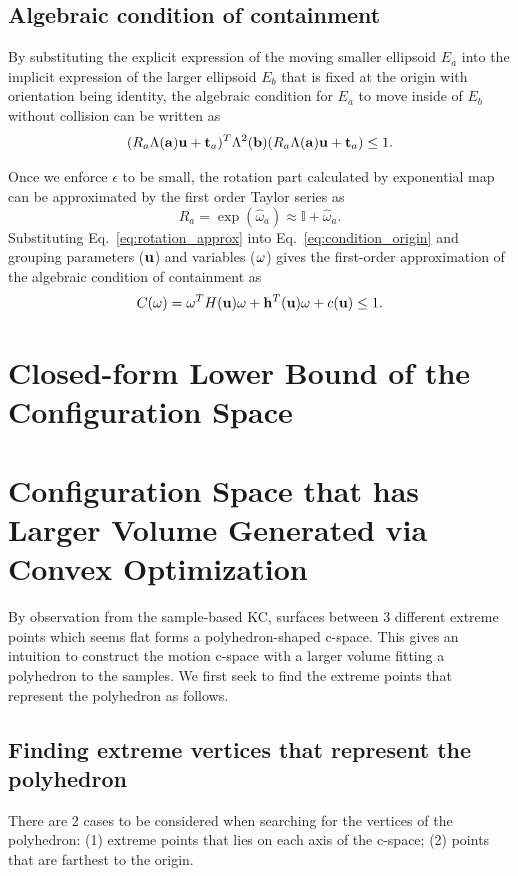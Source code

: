 \documentclass{article}
\begin{document}
\subsection{Algebraic condition of containment}
By substituting the explicit expression of the moving smaller ellipsoid $E_a$ into the implicit expression of the larger ellipsoid $E_b$ that is fixed at the origin with orientation being identity, the algebraic condition for $E_a$ to move inside of $E_b$ without collision can be written as
\begin{equation}
\label{eq:condition_origin}
(R_a \Lambda({\bf a}) {\bf u} + {\bf t}_a)^T \Lambda^2({\bf b}) (R_a \Lambda({\bf a}) {\bf u} + {\bf t}_a) \leq 1.
\end{equation}

Once we enforce $\epsilon$ to be small, the rotation part calculated by exponential map can be approximated by the first order Taylor series as
\begin{equation}
\label{eq:rotation_approx}
R_a = \exp(\hat{\omega}_a) \approx \mathbb{I} + \hat{\omega}_a.
\end{equation}
Substituting Eq.~\ref{eq:rotation_approx} into Eq.~\ref{eq:condition_origin} and grouping parameters (${\bf u}$) and variables (${\bf \omega}$) gives the first-order approximation of the algebraic condition of containment as
\begin{equation}
C({\bf \omega}) = {\bf \omega}^T H({\bf u}) {\bf \omega} + {\bf h}^T({\bf u}) {\bf \omega} + c({\bf u}) \leq 1.
\end{equation}

\section{Closed-form Lower Bound of the Configuration Space}

\section{Configuration Space that has Larger Volume Generated via Convex Optimization}
By observation from the sample-based KC, surfaces between 3 different extreme points which seems flat forms a polyhedron-shaped c-space. This gives an intuition to construct the motion c-space with a larger volume fitting a polyhedron to the samples. We first seek to find the extreme points that represent the polyhedron as follows.

\subsection{Finding extreme vertices that represent the polyhedron}
There are 2 cases to be considered when searching for the vertices of the polyhedron: (1) extreme points that lies on each axis of the c-space; (2) points that are farthest to the origin.
\end{document}
